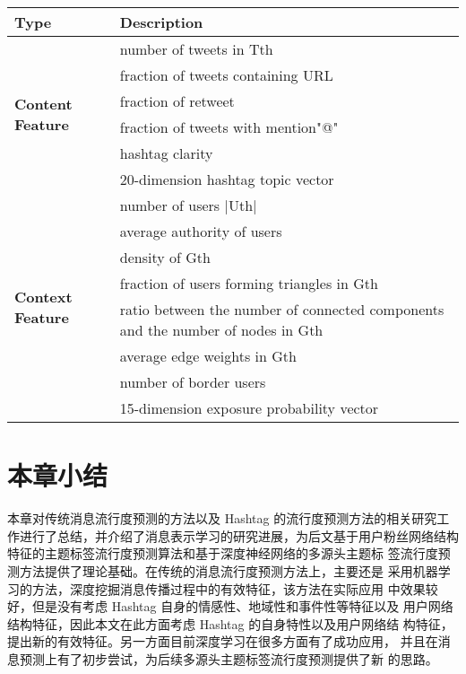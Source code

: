 \begin{table}[!htbp]

    \label{tab:hashtag-feature}
    \centering
    \footnotesize%
    \setlength{\tabcolsep}{4pt}%
    \renewcommand{\arraystretch}{1.2}%
    \begin{tabular}{|l|l|}
        \hline
        \textbf{Type} & \textbf{Description}\\
        \hline
        \multirow{6}{*}{\textbf{Content Feature}}& number of tweets in Tth\\
&fraction of tweets containing URL\\
&fraction of retweet\\
&fraction of tweets with mention"@"\\
&hashtag clarity\\
&20-dimension hashtag topic vector\\ \hline

\multirow{8}{*}{\textbf{Context Feature}}
&number of users |Uth|\\
&average authority of users\\
&density of Gth\\
&fraction of users forming triangles in Gth\\
&ratio between the number of connected components and the number of nodes in Gth\\
&average edge weights in Gth\\
&number of border users\\
&15-dimension exposure probability vector\\ \hline
    \end{tabular}
\end{table}

\section{本章小结}
本章对传统消息流行度预测的方法以及 Hashtag 的流行度预测方法的相关研究工作进行了总结，并介绍了消息表示学习的研究进展，为后文基于用户粉丝网络结构特征的主题标签流行度预测算法和基于深度神经网络的多源头主题标 签流行度预测方法提供了理论基础。在传统的消息流行度预测方法上，主要还是 采用机器学习的方法，深度挖掘消息传播过程中的有效特征，该方法在实际应用 中效果较好，但是没有考虑 Hashtag 自身的情感性、地域性和事件性等特征以及 用户网络结构特征，因此本文在此方面考虑 Hashtag 的自身特性以及用户网络结 构特征，提出新的有效特征。另一方面目前深度学习在很多方面有了成功应用， 并且在消息预测上有了初步尝试，为后续多源头主题标签流行度预测提供了新 的思路。